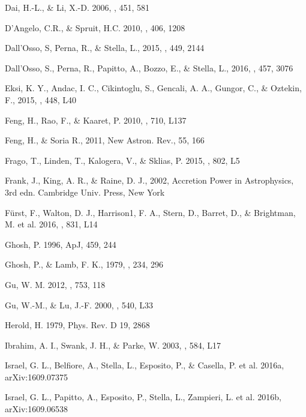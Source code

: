\documentclass[12pt,preprint]{aastex}
\begin{document}
\begin{thebibliography}{28}
Dai, H.-L., \& Li, X.-D. 2006, \aap, 451, 581

D'Angelo, C.R., \& Spruit, H.C. 2010, \mnras, 406, 1208

Dall'Osso, S, Perna, R., \& Stella, L., 2015, \mnras, 449, 2144

Dall'Osso, S., Perna, R., Papitto, A., Bozzo, E., \& Stella, L., 2016, \mnras, 457, 3076

Eksi, K. Y., Andac, I. C., Cikintoglu, S., Gencali, A. A., Gungor, C., \& Oztekin, F., 2015, \mnras, 448, L40

Feng, H., Rao, F., \& Kaaret, P. 2010, \apjl, 710, L137

Feng, H., \& Soria R., 2011, New Astron. Rev., 55, 166

Frago, T., Linden, T., Kalogera, V., \& Sklias, P. 2015, \apjl, 802, L5

Frank, J., King, A. R., \& Raine, D. J., 2002, Accretion Power in Astrophysics, 3rd edn. Cambridge Univ. Press, New York

F\"urst, F., Walton, D. J.,  Harrison1, F. A.,  Stern, D., Barret, D., \& Brightman, M. et al. 2016, \apjl, 831, L14

Ghosh, P. 1996, ApJ, 459, 244

Ghosh, P., \& Lamb, F. K., 1979, \apj, 234, 296

Gu, W. M. 2012, \apj, 753, 118

Gu, W.-M., \& Lu, J.-F. 2000, \apjl, 540, L33

Herold, H. 1979, Phys. Rev. D 19, 2868

Ibrahim, A. I., Swank, J. H., \& Parke, W. 2003, \apjl, 584, L17

Israel, G. L., Belfiore, A., Stella, L., Esposito, P., \&
Casella, P. et al. 2016a, arXiv:1609.07375

Israel, G. L., Papitto, A., Esposito, P., Stella, L., Zampieri, L. et al. 2016b, arXiv:1609.06538


\end{thebibliography}
\end{document}
